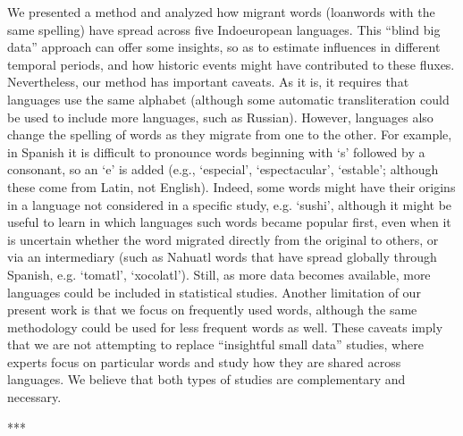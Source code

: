 \documentclass[10pt,letterpaper]{article} %
\begin{document}
We presented a method and analyzed how migrant words (loanwords with the same spelling) have spread across five Indoeuropean languages. This ``blind big data'' approach can offer some insights, so as to estimate influences in different temporal periods, and how historic events might have contributed to these fluxes. Nevertheless, our method has important caveats. As it is, it requires that languages use the same alphabet (although some automatic transliteration could be used to include more languages, such as Russian). However, languages also change the spelling of words as they migrate from one to the other. For example, in Spanish it is difficult to pronounce words beginning with `s' followed by a consonant, so an `e' is added (e.g., `especial', `espectacular', `estable'; although these come from Latin, not English). Indeed, some words might have their origins in a language not considered in a specific study, e.g. `sushi', although it might be useful to learn in which languages such words became popular first, even when it is uncertain whether the word migrated directly from the original to others, or via an intermediary (such as Nahuatl words that have spread globally through Spanish, e.g. `tomatl', `xocolatl'). Still, as more data becomes available, more languages could be included in statistical studies. Another limitation of our present work is that we focus on frequently used words, although the same methodology could be used for less frequent words as well. These caveats imply that we are not attempting to replace ``insightful small data'' studies, where experts focus on particular words and study how they are shared across languages. We believe that both types of studies are complementary and necessary.

***

\end{document}
